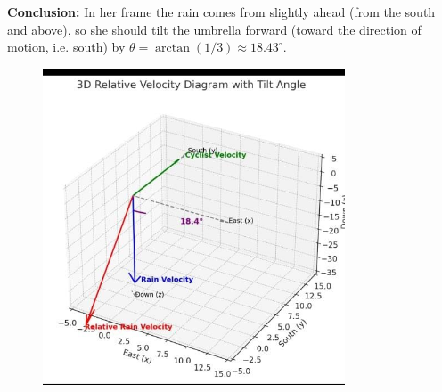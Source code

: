 \documentclass[journal]{IEEEtran}
\begin{document}
\noindent\textbf{Conclusion:} In her frame the rain comes from slightly ahead (from the south and above), so she should tilt the umbrella forward (toward the direction of motion, i.e. south) by $\theta=\arctan(1/3)\approx18.43^\circ$.

\begin{figure}[ht!]
    \centering
    \includegraphics[width=0.8\textwidth]{figs/matgeo-1.2.27.jpeg}
    \caption{}
    \label{fig:1.2.27.jpg}
\end{figure}
\end{document}
